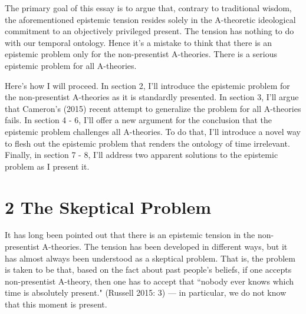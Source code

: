 \documentclass[a4paper,12pt]{article}
\begin{document}
The primary goal of this essay is to argue that, contrary to traditional wisdom, the aforementioned epistemic tension resides solely in the A-theoretic ideological commitment to an objectively privileged present. \footnotemark The tension has nothing to do with our temporal ontology. Hence it's a mistake to think that there is an epistemic problem only for the non-presentist A-theories. There is a serious epistemic problem for all A-theories.


Here's how I will proceed. In section 2, I'll introduce the epistemic problem for the non-presentist A-theories as it is standardly presented. In section 3, I'll argue that Cameron's (2015) recent attempt to generalize the problem for all A-theories fails. In section 4 - 6, I'll offer a new argument for the conclusion that the epistemic problem challenges all A-theories. To do that, I'll introduce a novel way to flesh out the epistemic problem that renders the ontology of time irrelevant. Finally, in section 7 - 8, I'll address two apparent solutions to the epistemic problem as I present it.

\section*{2 The Skeptical Problem}
It has long been pointed out that there is an epistemic tension in the non-presentist A-theories. The tension has been developed in different ways, but it has almost always been understood as a skeptical problem. That is, the problem is taken to be that, based on the fact about past people's beliefs, if one accepts non-presentist A-theory, then one has to accept that ``nobody ever knows which time is absolutely present." (Russell 2015: 3) --- in particular, we do not know that this moment is present.
\end{document}
